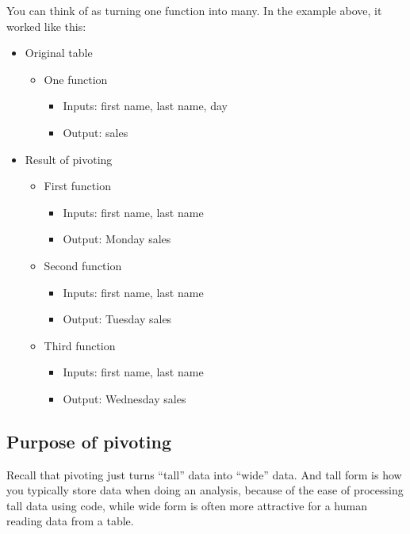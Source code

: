 \documentclass[letterpaper,10pt,english]{sphinxmanual}
\begin{document}
You can think of  as turning one function into many.  In the example above, it worked like this:
\begin{itemize}
\item {} 
Original table
\begin{itemize}
\item {} 
One function
\begin{itemize}
\item {} 
Inputs: first name, last name, day

\item {} 
Output: sales

\end{itemize}

\end{itemize}

\item {} 
Result of pivoting
\begin{itemize}
\item {} 
First function
\begin{itemize}
\item {} 
Inputs: first name, last name

\item {} 
Output: Monday sales

\end{itemize}

\item {} 
Second function
\begin{itemize}
\item {} 
Inputs: first name, last name

\item {} 
Output: Tuesday sales

\end{itemize}

\item {} 
Third function
\begin{itemize}
\item {} 
Inputs: first name, last name

\item {} 
Output: Wednesday sales

\end{itemize}

\end{itemize}

\end{itemize}


\subsection{Purpose of pivoting}
\label{\detokenize{chapter-6-single-table-verbs:purpose-of-pivoting}}
Recall that pivoting just turns “tall” data into “wide” data.  And tall form is how you typically store data when doing an analysis, because of the ease of processing tall data using code, while wide form is often more attractive for a human reading data from a table.  
\end{document}
